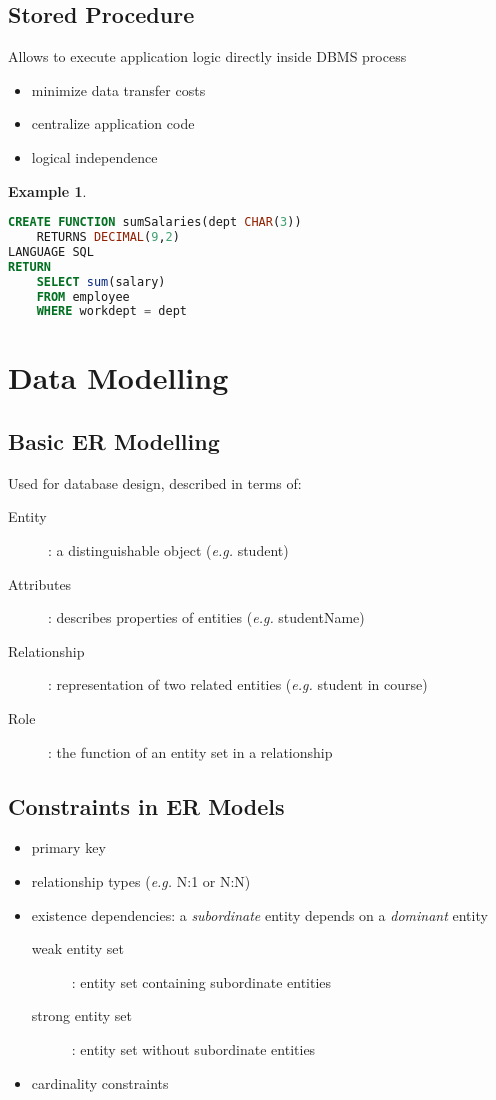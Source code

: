 \documentclass[]{article}
\theoremstyle{definition}
\newtheorem{ex}{Example}[section]
\begin{document}
		\subsection{Stored Procedure}
			Allows to execute application logic directly inside DBMS process
			\begin{itemize}
				\item minimize data transfer costs
				\item centralize application code
				\item logical independence
			\end{itemize}
			\begin{ex}
				\begin{lstlisting}[language=SQL]
CREATE FUNCTION sumSalaries(dept CHAR(3))
	RETURNS DECIMAL(9,2)
LANGUAGE SQL
RETURN
	SELECT sum(salary)
	FROM employee
	WHERE workdept = dept
				\end{lstlisting}
			\end{ex}

	\section{Data Modelling}
	\subsection{Basic ER Modelling}
	Used for database design, described in terms of:
	\begin{description}
		\item[Entity]: a distinguishable object (\textit{e.g.} student)
		\item[Attributes]: describes properties of entities (\textit{e.g.} studentName)
		\item[Relationship]: representation of two related entities (\textit{e.g.} student in course)
		\item[Role]: the function of an entity set in a relationship
	\end{description}

	\subsection{Constraints in ER Models}
	\begin{itemize}
		\item primary key
		\item relationship types (\textit{e.g.} N:1 or N:N)
		\item existence dependencies: a \textit{subordinate} entity depends on a \textit{dominant} entity
			\begin{description}
				\item[weak entity set]: entity set containing subordinate entities
				\item[strong entity set]: entity set without subordinate entities
			\end{description}
		\item cardinality constraints 
	\end{itemize}
\end{document}
